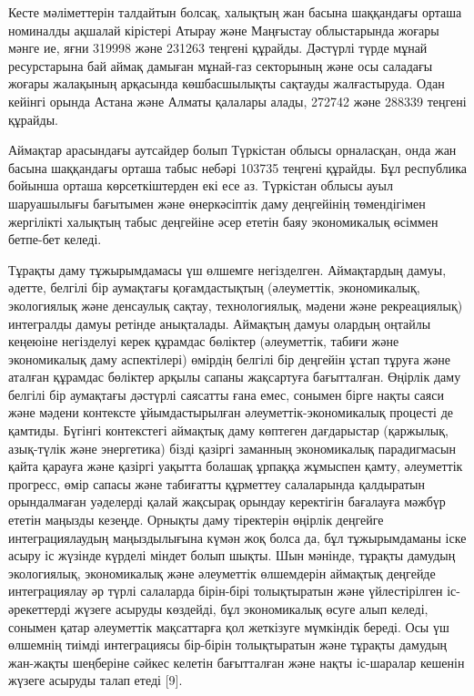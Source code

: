 \begin{multicols}{2}
Кесте мәліметтерін талдайтын болсақ, халықтың жан басына шаққандағы
орташа номиналды ақшалай кірістері Атырау және Маңғыстау облыстарында
жоғары мәнге ие, яғни 319998 және 231263 теңгені құрайды. Дәстүрлі түрде
мұнай ресурстарына бай аймақ дамыған мұнай-газ секторының және осы
саладағы жоғары жалақының арқасында көшбасшылықты сақтауды жалғастыруда.
Одан кейінгі орында Астана және Алматы қалалары алады, 272742 және
288339 теңгені құрайды.

Аймақтар арасындағы аутсайдер болып Түркістан облысы орналасқан, онда
жан басына шаққандағы орташа табыс небәрі 103735 теңгені құрайды. Бұл
республика бойынша орташа көрсеткіштерден екі есе аз. Түркістан облысы
ауыл шаруашылығы бағытымен және өнеркәсіптік даму деңгейінің
төмендігімен жергілікті халықтың табыс деңгейіне әсер ететін баяу
экономикалық өсіммен бетпе-бет келеді.

Тұрақты даму тұжырымдамасы үш өлшемге негізделген. Аймақтардың дамуы,
әдетте, белгілі бір аумақтағы қоғамдастықтың (әлеуметтік, экономикалық,
экологиялық және денсаулық сақтау, технологиялық, мәдени және
рекреациялық) интегралды дамуы ретінде анықталады. Аймақтың дамуы
олардың оңтайлы кеңеюіне негізделуі керек құрамдас бөліктер (әлеуметтік,
табиғи және экономикалық даму аспектілері) өмірдің белгілі бір деңгейін
ұстап тұруға және аталған құрамдас бөліктер арқылы сапаны жақсартуға
бағытталған. Өңірлік даму белгілі бір аумақтағы дәстүрлі саясатты ғана
емес, сонымен бірге нақты саяси және мәдени контексте ұйымдастырылған
әлеуметтік-экономикалық процесті де қамтиды. Бүгінгі контекстегі
аймақтық даму көптеген дағдарыстар (қаржылық, азық-түлік және
энергетика) бізді қазіргі заманның экономикалық парадигмасын қайта
қарауға және қазіргі уақытта болашақ ұрпаққа жұмыспен қамту, әлеуметтік
прогресс, өмір сапасы және табиғатты құрметтеу салаларында қалдыратын
орындалмаған уәделерді қалай жақсырақ орындау керектігін бағалауға
мәжбүр ететін маңызды кезеңде. Орнықты даму тіректерін өңірлік деңгейге
интеграциялаудың маңыздылығына күмән жоқ болса да, бұл тұжырымдаманы
іске асыру іс жүзінде күрделі міндет болып шықты. Шын мәнінде, тұрақты
дамудың экологиялық, экономикалық және әлеуметтік өлшемдерін аймақтық
деңгейде интеграциялау әр түрлі салаларда бірін-бірі толықтыратын және
үйлестірілген іс-әрекеттерді жүзеге асыруды көздейді, бұл экономикалық
өсуге алып келеді, сонымен қатар әлеуметтік мақсаттарға қол жеткізуге
мүмкіндік береді. Осы үш өлшемнің тиімді интеграциясы бір-бірін
толықтыратын және тұрақты дамудың жан-жақты шеңберіне сәйкес келетін
бағытталған және нақты іс-шаралар кешенін жүзеге асыруды талап етеді
{[}9{]}.


\end{multicols}

